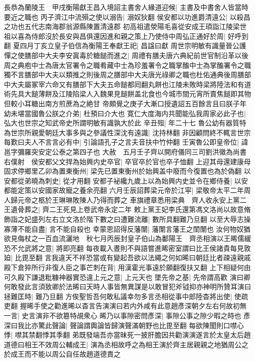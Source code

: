 長恭為蘭陵王　甲戌衡陽獻王昌入境詔主書舍人緣道迎候|{
	主書及中書舍人皆當時要近之職也}
丙子濟江中流殞之使以溺告|{
	溺奴狄翻}
侯安都以功進爵清遠公|{
	以殺昌之功也五代志南海郡翁源縣陳置清遠郡}
初高祖遣滎陽毛喜從安成王頊詣江陵梁世祖以喜為侍郎沒於長安與昌俱還因進和親之策上乃使侍中周弘正通好於周|{
	好呼到翻}
夏四月丁亥立皇子伯信為衡陽王奉獻王祀|{
	昌諡曰獻}
周世宗明敏有識量晉公護憚之使膳部中大夫李安寘毒於糖䭔而進之|{
	周禮有膳夫唐六典紀前世官制沿革以後周之典庖中士為唐太官署令之職肴藏中士為珍羞署令之職掌醢中士為掌醢署令之職獨不言膳部中大夫以類推之則後周之膳部中大夫唐光祿卿之職也杜佑通典後周膳部中大夫屬冢宰六命又有膳部下大夫五命䭔都囘翻丸餅也江陵未敗時梁將陸法和有道術先具大䭔薄餅及江陵陷梁人入魏果見䭔餅盖北食也今城市間元宵所賣焦䭔即其物但較小耳糖出南方煎蔗為之絶甘}
帝頗覺之庚子大漸口授遺詔五百餘言且曰朕子年幼未堪當國魯公朕之介弟|{
	杜預曰介大也}
寛仁大度海内共聞能弘我周家必此子也|{
	弘大也世宗之知武帝史所謂明敏有識孰大於此}
辛丑殂|{
	年二十七}
魯公幼有器質特為世宗所親愛朝廷大事多與之參議性深沈有遠識|{
	沈持林翻}
非因顧問終不輒言世宗每歎曰夫人不言言必有中|{
	引論語孔子之言夫音扶中竹仲翻}
壬寅魯公即皇帝位|{
	諱邕字彌羅突安定公泰之第四子也}
大赦　五月壬子齊以開府儀同三司劉洪徽為尚書右僕射　侯安都父文捍為始興内史卒官|{
	卒官卒於官也卒子恤翻}
上迎其母還建康母固求停鄉里乙卯為置東衡州|{
	梁先已置東衡州於始興盖中廢而今復置也為於偽翻}
以安都從弟曉為刺史|{
	從才用翻}
安都子袐纔九歲上以為始興内史並令在鄉侍養|{
	以安都能定策以安國家故寵之養余亮翻}
六月壬辰詔葬梁元帝於江寜|{
	梁敬帝太平二年周人歸元帝之柩於王琳琳敗陳人乃得而葬之}
車旗禮章悉用梁典　齊人收永安上黨二王遺骨葬之|{
	齊二王死見上卷武帝永定二年}
敕上黨王妃李氏還第馮文洛尚以故意脩飾詣之妃盛列左右立文洛於階下數之曰遭難流離|{
	數所具翻難乃旦翻}
以至大辱志操寡薄不能自盡|{
	言不能自殺也}
幸蒙恩詔得反藩闈|{
	藩闈言藩王之閨闈也}
汝何物奴猶欲見侮杖之一百血流灑地　秋七月丙辰封皇子伯山為鄱陽王　齊丞相演以王晞儒緩恐不允武將之意|{
	將即亮翻}
每夜載入晝則不與語嘗進晞密室謂曰比王侯諸貴每見敦廹|{
	比毘至翻}
言我違天不祥恐當或有變起吾欲以法繩之何如晞曰朝廷比者疎遠親戚殿下倉猝所行非復人臣之事芒刺在背|{
	用漢霍光事遠於願翻復扶又翻}
上下相疑何由可久殿下謙退粃糠神器實恐違上元之意|{
	上元天也}
墜先帝之基|{
	先帝謂高歡}
演曰卿何敢發此言須致卿於法晞曰天時人事皆無異謀是以敢冒犯斧钺抑亦神明所贊耳演曰拯難匡時|{
	難乃旦翻}
方俟聖哲吾何敢私議幸勿多言丞相從事中郎陸杳將出使|{
	使疏吏翻}
握晞手使之勸進晞以杳言告演演曰若内外咸有此意趙彥深朝夕左右何故初無一言|{
	史言演非不欲簒特覘衆心}
晞乃以事隙密問彥深|{
	事隙公事之隙少暇之時也}
彥深曰我比亦驚此聲論|{
	聲論謂輿論皆歸演聲滿朝野也比毘至翻}
每欲陳聞則口噤心悸|{
	噤其禁翻悸其季翻}
弟既發端吾亦當昧死一披肝膽因共勸演演遂言於太皇太后趙道德曰相王不效周公輔成王|{
	演為丞相故呼之為相王演於齊主居親親之地猶周公之於成王而不能以周公自任故趙道德責之}
